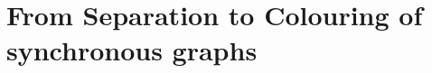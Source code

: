 \section{%
	\AP\label{sec:dichotomy-colouring}%
	From Separation to Colouring of synchronous graphs
}



